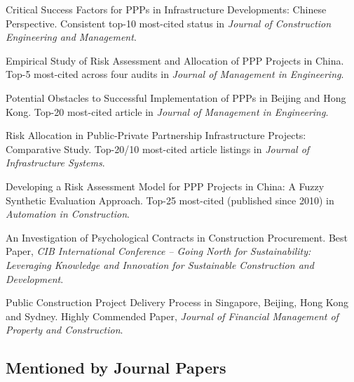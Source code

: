 \documentclass[11pt,a4paper]{report} %
\begin{document}
\begin{tablist}
        \item[2015--19] \tab{}Critical Success Factors for PPPs in Infrastructure Developments: Chinese Perspective. Consistent top-10 most-cited status in \textit{Journal of Construction Engineering and Management}.  
        
        \item[2016--20] \tab{}Empirical Study of Risk Assessment and Allocation of PPP Projects in China. Top-5 most-cited across four audits in \textit{Journal of Management in Engineering}.  
        
        \item[2016] \tab{}Potential Obstacles to Successful Implementation of PPPs in Beijing and Hong Kong. Top-20 most-cited article in \textit{Journal of Management in Engineering}.  
        
        \item[2014, 20] \tab{}Risk Allocation in Public-Private Partnership Infrastructure Projects: Comparative Study. Top-20/10 most-cited article listings in \textit{Journal of Infrastructure Systems}.  
        
        \item[2015] \tab{}Developing a Risk Assessment Model for PPP Projects in China: A Fuzzy Synthetic Evaluation Approach. Top-25 most-cited (published since 2010) in \textit{Automation in Construction}.  
        
        \item[2015] \tab{}An Investigation of Psychological Contracts in Construction Procurement. Best Paper, \textit{CIB International Conference -- Going North for Sustainability: Leveraging Knowledge and Innovation for Sustainable Construction and Development}. 
        
        \item[2014] \tab{}Public Construction Project Delivery Process in Singapore, Beijing, Hong Kong and Sydney. Highly Commended Paper, \textit{Journal of Financial Management of Property and Construction}.  
    
    \end{tablist} 

    \subsection*{Mentioned by Journal Papers}
    
\end{document}
